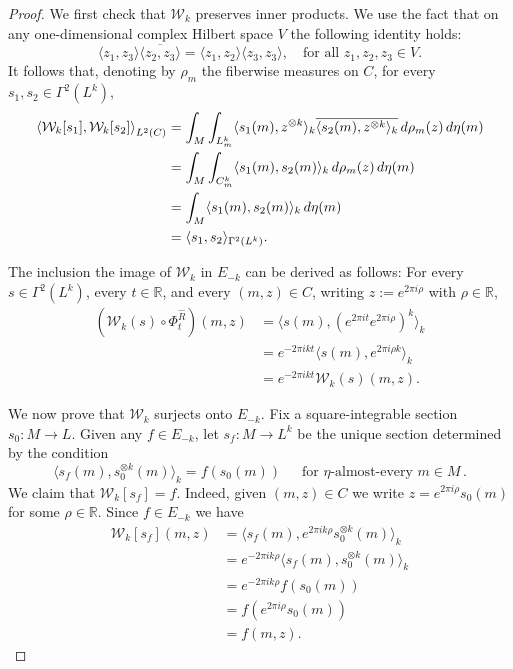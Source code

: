 \documentclass{amsart}
\theoremstyle{definition}
\theoremstyle{remark}
\numberwithin{equation}{section}
\newcommand{\wR}{\widehat{R}}
\newcommand{\<}{{\langle}}
\renewcommand{\>}{{\rangle}}
\newcommand{\jayadev}[1]{{\color{purple} \sf  J: [#1]}}
\begin{document}
\begin{proof}
    
    We first check that $\mathcal{W}_k$ preserves inner products. We use the fact that on any one-dimensional complex Hilbert space $V$ the following identity holds:
    \begin{equation*}
    \label{eq:identity}
    \langle z_1, z_3\rangle \overline{\langle z_2,z_3 \rangle} = \langle z_1,z_2 \rangle \langle z_3,z_3 \rangle, \quad \text{for all } z_1,z_2,z_3 \in V.
    \end{equation*}
    It follows that, denoting by $\rho_m$ the fiberwise measures on $C$, for every $s_1,s_2 \in \Gamma^2(L^k)$, 
    \begin{align*}
        \left\langle\mathcal{W}_k[s_1],\mathcal{W}_k[s_2]\right\rangle_{L^2(C)} &= \int_M \int_{L^k_m} \langle s_1(m),z^{\otimes k} \rangle_k \overline{\langle s_2(m),z^{\otimes k} \rangle_k} \thinspace d\rho_m(z) \thinspace d\eta(m) \\
        &= \int_M \int_{C^k_m} \langle s_1(m),s_2(m) \rangle_k \thinspace d\rho_m(z) \thinspace d\eta(m)\\
        &= \int_M \langle s_1(m),s_2(m) \rangle_k \thinspace d\eta(m)\\
        &= \langle s_1,s_2\rangle_{\Gamma^2(L^k)}.
    \end{align*}

    The inclusion the image of $\mathcal{W}_k$ in $E_{-k}$ can be derived as follows: For every $s \in \Gamma^2(L^k)$, every $t \in \mathbb{R}$, and every $(m,z) \in C$, writing $z:= e^{2\pi i \rho}$ with $\rho \in \mathbb{R}$,
$$
\begin{aligned}
(\mathcal{W}_k(s) \circ \Phi^{\wR}_t) (m,z) &=\langle s(m), (e^{2\pi it} e^{2\pi i\rho})^k\rangle_k \\ &= e^{-2\pi ikt} \langle s(m), e^{2\pi i \rho k}\rangle_k \\
&= e^{-2\pi ikt}\mathcal{W}_k(s)(m,z).
\end{aligned}
$$

We now prove that $\mathcal{W}_k$ surjects onto $E_{-k}$. Fix a square-integrable section $s_0 \colon M \to L$. Given any $f\in E_{-k}$, let $s_f \colon M \to L^k$ be the unique section determined by the condition
$$
\langle s_f(m), s_0^{\otimes k}(m) \rangle_k = f(s_0(m)) \, \quad \text{ for $\eta$-almost-every } m \in M \,.
$$
We claim that $\mathcal{W}_k[s_f] =f$. Indeed, given $(m,z) \in C$ we write $z = e^{2 \pi i \rho} s_0(m)$ for some $\rho \in \mathbb{R}$. Since $f \in E_{-k}$ we have 
$$
\begin{aligned}
\mathcal{W}_k[s_f](m,z)
&= \langle s_f(m), e^{2\pi i k\rho} s_0^{\otimes k}(m) \rangle_k \\
&= e^{-2 \pi ik \rho} \langle s_f(m), s_0^{\otimes k}(m) \rangle_k \\
&= e^{-2 \pi ik \rho} f(s_0(m)) \\
&= f(e^{2 \pi i \rho}s_0(m))\\
&= f(m,z).
\end{aligned}$$


\end{proof}
\end{document}

